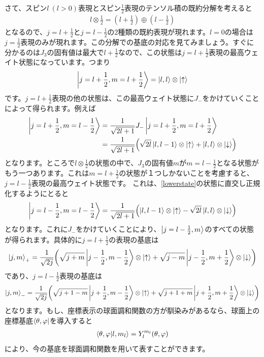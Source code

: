 \documentclass[report,paper=a4, fontsize=12pt, line_length=16cm, number_of_lines=33,dvipdfmx]{jlreq}
\numberwithin{equation}{chapter}
\newcommand{\uket}{\ket{\uparrow}}
\newcommand{\dket}{\ket{\downarrow}}
\begin{document}
さて、スピン$l\ (l>0)$表現とスピン$\frac12$表現のテンソル積の既約分解を考えると
\begin{align}
  l\otimes \frac12 = (l+\frac12)\oplus (l-\frac12)
\end{align}
となるので、$j=l+\frac12$と$j=l-\frac12$の2種類の既約表現が現れます。$l=0$の場合は$j=\frac12$表現のみが現れます。この分解での基底の対応を見てみましょう。すぐに分かるのは$J_3$の固有値は最大で$l+\frac12$なので、この状態は$j=l+\frac12$表現の最高ウェイト状態になっています。つまり
\begin{align}
  \ket{j=l+\frac12,m=l+\frac12}=\ket{l,l}\otimes \uket \label{hws}
\end{align}
です。$j=l+\frac12$表現の他の状態は、この最高ウェイト状態に$J_{-}$をかけていくことによって得られます。例えば
\begin{align}
  \ket{j=l+\frac12,m=l-\frac12}
  &=\frac{1}{\sqrt{2l+1}}J_{-}\ket{j=l+\frac12,m=l+\frac12}\nonumber\\
  &=\frac{1}{\sqrt{2l+1}}\qty(\sqrt{2l}\ket{l,l-1}\otimes \uket + \ket{l,l}\otimes\dket)\label{lowerstate}
\end{align}
となります。ところで$l\otimes \frac12$の状態の中で、$J_3$の固有値$m$が$m=l-\frac12$となる状態がもう一つあります。これは$m=l+\frac12$の状態が１つしかないことを考慮すると、$j=l-\frac12$表現の最高ウェイト状態です。
これは、\eqref{lowerstate}の状態に直交し正規化するようにとると
\begin{align}
  \ket{j=l-\frac12,m=l-\frac12}
  =\frac{1}{\sqrt{2l+1}}\qty(\ket{l,l-1}\otimes \uket - \sqrt{2l}\ket{l,l}\otimes\dket)
\end{align}
となります。これに$J_{-}$をかけていくことにより、$\ket{j=l-\frac12,m}$のすべての状態が得られます。具体的に$j=l+\frac12$の表現の基底は
\begin{align*}
  \ket{j,m}_{+}=\frac{1}{\sqrt{2j}}\qty(\sqrt{j+m}\ket{j-\frac12,m-\frac12}\otimes\uket+\sqrt{j-m}\ket{j-\frac12,m+\frac12}\otimes \dket)
\end{align*}
であり、$j=l-\frac12$表現の基底は
\begin{align*}
  \ket{j,m}_{-}=\frac{1}{\sqrt{2j}}\qty(\sqrt{j+1-m}\ket{j+\frac12,m-\frac12}\otimes\uket+\sqrt{j+1+m}\ket{j+\frac12,m+\frac12}\otimes \dket)
\end{align*}
となります。もし、座標表示の球面調和関数の方が馴染みがあるなら、球面上の座標基底$\bra{\theta,\varphi}$を導入すると
\begin{align*}
  \braket{\theta,\varphi}{l,m_{l}}=Y^{m_l}_{l}(\theta,\varphi)
\end{align*}
により、今の基底を球面調和関数を用いて表すことができます。
\end{document}
